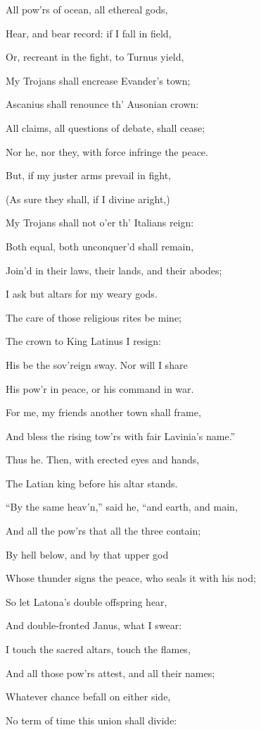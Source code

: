 All pow’rs of ocean, all ethereal gods,

Hear, and bear record: if I fall in field,

Or, recreant in the fight, to Turnus yield,

My Trojans shall encrease Evander’s town;

Ascanius shall renounce th’ Ausonian crown:

All claims, all questions of debate, shall cease;

Nor he, nor they, with force infringe the peace.

But, if my juster arms prevail in fight,

(As sure they shall, if I divine aright,)

My Trojans shall not o’er th’ Italians reign:

Both equal, both unconquer’d shall remain,

Join’d in their laws, their lands, and their abodes;

I ask but altars for my weary gods.

The care of those religious rites be mine;

The crown to King Latinus I resign:

His be the sov’reign sway. Nor will I share

His pow’r in peace, or his command in war.

For me, my friends another town shall frame,

And bless the rising tow’rs with fair Lavinia’s name.”

Thus he. Then, with erected eyes and hands,

The Latian king before his altar stands.

“By the same heav’n,” said he, “and earth, and main,

And all the pow’rs that all the three contain;

By hell below, and by that upper god

Whose thunder signs the peace, who seals it with his nod;

So let Latona’s double offspring hear,

And double-fronted Janus, what I swear:

I touch the sacred altars, touch the flames,

And all those pow’rs attest, and all their names;

Whatever chance befall on either side,

No term of time this union shall divide:

